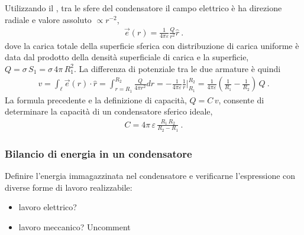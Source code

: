 \documentclass[letterpaper,10pt,italian]{jupyterBook}
\begin{document}
\sphinxAtStartPar
Utilizzando il {\hyperref[\detokenize{ch/electromagnetism/electrostatics:physics-hs-electromagnetism-electrostatics-maxwell-gauss}]{}}, tra le sfere del condensatore il campo elettrico è ha direzione radiale e valore assoluto \(\propto r^{-2}\),
\begin{equation*}
\begin{split}\vec{e}(r) = \frac{1}{4 \pi \varepsilon} \frac{Q}{r^2} \hat{r} \ .\end{split}
\end{equation*}
\sphinxAtStartPar
dove la carica totale della superficie sferica con distribuzione di carica uniforme è data dal prodotto della densità superficiale di carica e la superficie, \(Q = \sigma \, S_1 = \sigma \, 4 \pi \, R_1^2\).
La differenza di potenziale tra le due armature è quindi
\begin{equation*}
\begin{split}v = \int_{\ell} \vec{e}(r) \cdot \hat{r} = \int_{r=R_1}^{R_2} \frac{Q}{4 \pi r^2} dr = - \frac{1}{4 \pi \varepsilon} \frac{1}{r} \bigg|_{R_1}^{R_2} = \frac{1}{4 \pi \varepsilon} \left(\frac{1}{R_1} - \frac{1}{R_2} \right) \, Q \ .\end{split}
\end{equation*}
\sphinxAtStartPar
La formula precedente e la definizione di capacità, \(Q = C \, v\), consente di determinare la capacità di un condensatore sferico ideale,
\begin{equation*}
\begin{split}C = 4 \pi \, \varepsilon \,  \frac{R_1 \, R_2}{R_2 - R_1} \ .\end{split}
\end{equation*}

\subsubsection{Bilancio di energia in un condensatore}
\label{\detokenize{ch/electromagnetism/electrostatics:bilancio-di-energia-in-un-condensatore}}
\sphinxAtStartPar
{} Definire l’energia immagazzinata nel condensatore e verificarne l’espressione con diverse forme di lavoro realizzabile:
\begin{itemize}
\item {} 
\sphinxAtStartPar
lavoro elettrico?

\item {} 
\sphinxAtStartPar
lavoro meccanico? Un\sphinxhyphen{}comment

\end{itemize}
\end{document}
